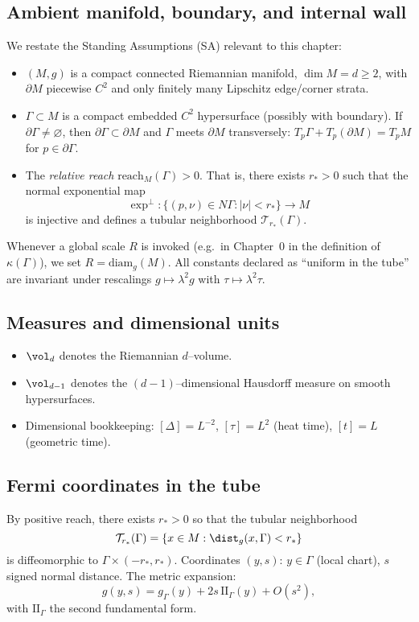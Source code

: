 \subsection{Ambient manifold, boundary, and internal wall}
We restate the Standing Assumptions (SA) relevant to this chapter:
\begin{itemize}
  \item $(M,g)$ is a compact connected Riemannian manifold, $\dim M=d\ge2$, with $\partial M$ piecewise $C^2$ and only finitely many Lipschitz edge/corner strata.
  \item $\Gamma\subset M$ is a compact embedded $C^2$ hypersurface (possibly with boundary). If $\partial\Gamma\ne\varnothing$, then $\partial\Gamma\subset \partial M$ and $\Gamma$ meets $\partial M$ transversely: $T_p\Gamma+T_p(\partial M)=T_pM$ for $p\in\partial\Gamma$.
  \item The \emph{relative reach} $\mathrm{reach}_M(\Gamma)>0$. That is, there exists $r_*>0$ such that the normal exponential map
  \[
  \exp^\perp:\{(p,\nu)\in N\Gamma:|\nu|<r_*\}\to M
  \]
  is injective and defines a tubular neighborhood $\mathcal T_{r_*}(\Gamma)$.
\end{itemize}

\begin{remark}
Whenever a global scale $R$ is invoked (e.g.\ in Chapter~0 in the definition of $\kappa(\Gamma)$), we set $R=\mathrm{diam}_g(M)$. 
All constants declared as “uniform in the tube” are invariant under rescalings $g\mapsto \lambda^2g$ with $\tau\mapsto \lambda^2\tau$.
\end{remark}

\subsection{Measures and dimensional units}
\begin{itemize}
  \item $\vol_d$ denotes the Riemannian $d$–volume.
  \item $\vol_{d-1}$ denotes the $(d-1)$–dimensional Hausdorff measure on smooth hypersurfaces.
  \item Dimensional bookkeeping: $[\Delta]=L^{-2}$, $[\tau]=L^2$ (heat time), $[t]=L$ (geometric time).
\end{itemize}

\subsection{Fermi coordinates in the tube}
By positive reach, there exists $r_*>0$ so that the tubular neighborhood 
\[
\mathcal T_{r_*}(\Gamma)=\{x\in M:\dist_g(x,\Gamma)<r_*\}
\]
is diffeomorphic to $\Gamma\times (-r_*,r_*)$. 
Coordinates $(y,s)$: $y\in\Gamma$ (local chart), $s$ signed normal distance. 
The metric expansion:
\[
g(y,s)=g_\Gamma(y)+2s\,\mathrm{II}_\Gamma(y)+O(s^2),
\]
with $\mathrm{II}_\Gamma$ the second fundamental form.

